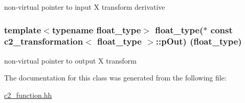 non-\/virtual pointer to input X transform derivative 

\subsubsection[{\texorpdfstring{p\+Out}{pOut}}]{\setlength{\rightskip}{0pt plus 5cm}template$<$typename float\+\_\+type$>$ float\+\_\+type($\ast$ const {\bf c2\+\_\+transformation}$<$ float\+\_\+type $>$\+::p\+Out) (float\+\_\+type)}\hypertarget{classc2__transformation_ae898d76b8582ecc9fc7bb5a6eb6ca1b4}{}\label{classc2__transformation_ae898d76b8582ecc9fc7bb5a6eb6ca1b4}


non-\/virtual pointer to output X transform 



The documentation for this class was generated from the following file\+:\begin{DoxyCompactItemize}
\item 
\hyperlink{c2__function_8hh}{c2\+\_\+function.\+hh}\end{DoxyCompactItemize}
